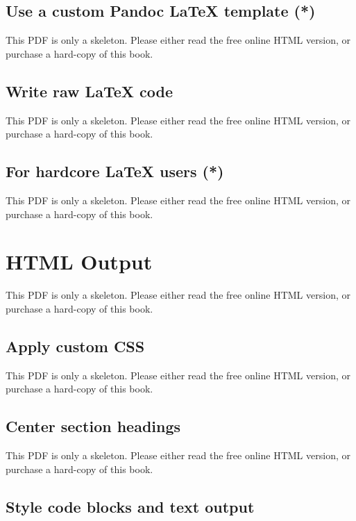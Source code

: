 \documentclass[
  11pt,
]{krantz}
\begin{document}
\section{Use a custom Pandoc LaTeX template (*)}\label{latex-template}

This PDF is only a skeleton. Please either read the free online HTML version, or purchase a hard-copy of this book.

\section{Write raw LaTeX code}\label{raw-latex}

This PDF is only a skeleton. Please either read the free online HTML version, or purchase a hard-copy of this book.

\section{For hardcore LaTeX users (*)}\label{latex-hardcore}

This PDF is only a skeleton. Please either read the free online HTML version, or purchase a hard-copy of this book.

\chapter{HTML Output}\label{html-output}

This PDF is only a skeleton. Please either read the free online HTML version, or purchase a hard-copy of this book.

\section{Apply custom CSS}\label{html-css}

This PDF is only a skeleton. Please either read the free online HTML version, or purchase a hard-copy of this book.

\section{Center section headings}\label{center-heading}

This PDF is only a skeleton. Please either read the free online HTML version, or purchase a hard-copy of this book.

\section{Style code blocks and text output}\label{chunk-styling}
\end{document}
